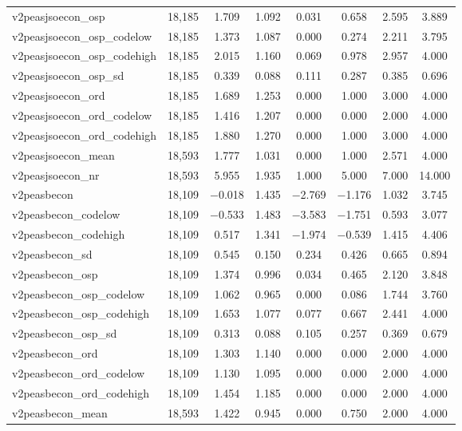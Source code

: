 \begin{table}[!htbp]
\begin{tabular}{@{\extracolsep{5pt}}lccccccc}
v2peasjsoecon\_osp & 18,185 & 1.709 & 1.092 & 0.031 & 0.658 & 2.595 & 3.889 \\ 
v2peasjsoecon\_osp\_codelow & 18,185 & 1.373 & 1.087 & 0.000 & 0.274 & 2.211 & 3.795 \\ 
v2peasjsoecon\_osp\_codehigh & 18,185 & 2.015 & 1.160 & 0.069 & 0.978 & 2.957 & 4.000 \\ 
v2peasjsoecon\_osp\_sd & 18,185 & 0.339 & 0.088 & 0.111 & 0.287 & 0.385 & 0.696 \\ 
v2peasjsoecon\_ord & 18,185 & 1.689 & 1.253 & 0.000 & 1.000 & 3.000 & 4.000 \\ 
v2peasjsoecon\_ord\_codelow & 18,185 & 1.416 & 1.207 & 0.000 & 0.000 & 2.000 & 4.000 \\ 
v2peasjsoecon\_ord\_codehigh & 18,185 & 1.880 & 1.270 & 0.000 & 1.000 & 3.000 & 4.000 \\ 
v2peasjsoecon\_mean & 18,593 & 1.777 & 1.031 & 0.000 & 1.000 & 2.571 & 4.000 \\ 
v2peasjsoecon\_nr & 18,593 & 5.955 & 1.935 & 1.000 & 5.000 & 7.000 & 14.000 \\ 
v2peasbecon & 18,109 & $-$0.018 & 1.435 & $-$2.769 & $-$1.176 & 1.032 & 3.745 \\ 
v2peasbecon\_codelow & 18,109 & $-$0.533 & 1.483 & $-$3.583 & $-$1.751 & 0.593 & 3.077 \\ 
v2peasbecon\_codehigh & 18,109 & 0.517 & 1.341 & $-$1.974 & $-$0.539 & 1.415 & 4.406 \\ 
v2peasbecon\_sd & 18,109 & 0.545 & 0.150 & 0.234 & 0.426 & 0.665 & 0.894 \\ 
v2peasbecon\_osp & 18,109 & 1.374 & 0.996 & 0.034 & 0.465 & 2.120 & 3.848 \\ 
v2peasbecon\_osp\_codelow & 18,109 & 1.062 & 0.965 & 0.000 & 0.086 & 1.744 & 3.760 \\ 
v2peasbecon\_osp\_codehigh & 18,109 & 1.653 & 1.077 & 0.077 & 0.667 & 2.441 & 4.000 \\ 
v2peasbecon\_osp\_sd & 18,109 & 0.313 & 0.088 & 0.105 & 0.257 & 0.369 & 0.679 \\ 
v2peasbecon\_ord & 18,109 & 1.303 & 1.140 & 0.000 & 0.000 & 2.000 & 4.000 \\ 
v2peasbecon\_ord\_codelow & 18,109 & 1.130 & 1.095 & 0.000 & 0.000 & 2.000 & 4.000 \\ 
v2peasbecon\_ord\_codehigh & 18,109 & 1.454 & 1.185 & 0.000 & 0.000 & 2.000 & 4.000 \\ 
v2peasbecon\_mean & 18,593 & 1.422 & 0.945 & 0.000 & 0.750 & 2.000 & 4.000 \\ 

\end{tabular}
\end{table}
